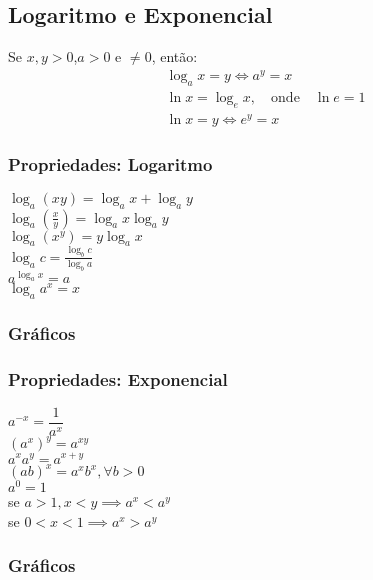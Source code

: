\subsection*{Logaritmo e Exponencial}
\begin{tcolorbox}
Se $x, y >0$,$a>0$ e $\neq 0$, então:
\begin{align*}
    &\log_ax =y  \iff a^y=x\\
    &\ln{x}=\log_e{x}, \quad \text{onde} \quad \ln{e}=1\\
    &\ln{x}=y \iff  e^y=x
\end{align*}
\begin{multicols}{2}
\subsubsection*{Propriedades: Logaritmo}
 $\log_{a}(xy)=\log_{a}x + \log_{a}y$\\[0.1cm]
 $\log_{a}(\frac{x}{y})=\log_{a}x  \log_{a}y$\\[0.1cm]
 $\log_{a}(x^y)=y\log_{a}x$\\[0.1cm]
$\log_{a}c=\frac{\log_{b}c}{\log_{b}a}$\\[0.1cm]
 $a^{\log_a x}=a$\\[0.1cm]
 $\log_aa^x =x$%

 \subsubsection*{Gráficos}
 \begin{Figure}
     
 \end{Figure}
\end{multicols}
 \end{tcolorbox}
\begin{tcolorbox}

\begin{multicols}{2}
\subsubsection*{Propriedades: Exponencial}
 $a^{-x}=\dfrac{1}{a^x}$\\
 $(a^x)^y=a^{xy}$\\
 $a^xa^y=a^{x+y}$\\
 $(ab)^x=a^xb^x, \forall b>0$\\
 $a^0=1$\\
 se $a>1,x<y \implies a^x < a^y$ \\
 se $0<x<1\implies a^x> a^y$
 \subsubsection*{Gráficos}
 \begin{Figure}
     
 \end{Figure}
\end{multicols}
\end{tcolorbox}
